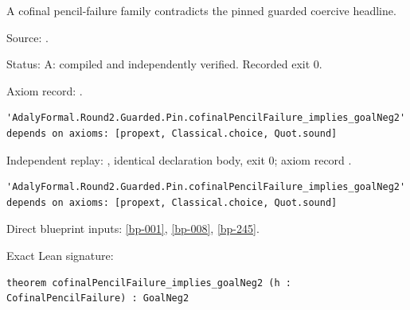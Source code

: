 \begin{theorem}[bp-009]
\label{bp-009}
\leanok
A cofinal pencil-failure family contradicts the pinned guarded coercive headline.

\par Source: \texttt{}.
\par Status: A: compiled and independently verified. Recorded exit 0.
\par Axiom record: \texttt{}.
\begin{verbatim}
'AdalyFormal.Round2.Guarded.Pin.cofinalPencilFailure_implies_goalNeg2' depends on axioms: [propext, Classical.choice, Quot.sound]
\end{verbatim}
\par Independent replay: \texttt{}, identical declaration body, exit 0; axiom record \texttt{}.
\begin{verbatim}
'AdalyFormal.Round2.Guarded.Pin.cofinalPencilFailure_implies_goalNeg2' depends on axioms: [propext, Classical.choice, Quot.sound]
\end{verbatim}
\par Direct blueprint inputs: \ref{bp-001}, \ref{bp-008}, \ref{bp-245}.
\par Exact Lean signature:
\begin{verbatim}
theorem cofinalPencilFailure_implies_goalNeg2 (h : CofinalPencilFailure) : GoalNeg2
\end{verbatim}
\end{theorem}

